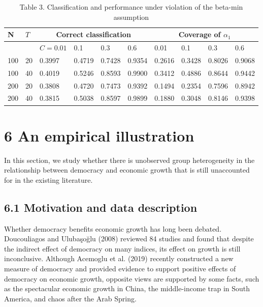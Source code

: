 \documentclass[10pt]{article}
\begin{document}
\begin{table}[h]
\begin{center}
\captionsetup{labelformat=empty}
\caption{Table 3. Classification and performance under violation of the beta-min assumption}
\begin{tabular}{|l|l|l|l|l|l|l|l|l|l|}
\hline
\multirow[b]{2}{*}{N} & \multirow[b]{2}{*}{$T$} & \multicolumn{4}{|c|}{Correct classification} & \multicolumn{4}{|c|}{Coverage of $\alpha_{1}$} \\
\hline
 &  & $C=0.01$ & 0.1 & 0.3 & 0.6 & 0.01 & 0.1 & 0.3 & 0.6 \\
\hline
100 & 20 & 0.3997 & 0.4719 & 0.7428 & 0.9354 & 0.2616 & 0.3428 & 0.8026 & 0.9068 \\
\hline
100 & 40 & 0.4019 & 0.5246 & 0.8593 & 0.9900 & 0.3412 & 0.4886 & 0.8644 & 0.9442 \\
\hline
200 & 20 & 0.3808 & 0.4720 & 0.7473 & 0.9392 & 0.1494 & 0.2354 & 0.7596 & 0.8942 \\
\hline
200 & 40 & 0.3815 & 0.5038 & 0.8597 & 0.9899 & 0.1880 & 0.3048 & 0.8146 & 0.9398 \\
\hline
\end{tabular}
\end{center}
\end{table}

\section*{6 An empirical illustration}
In this section, we study whether there is unobserved group heterogeneity in the relationship between democracy and economic growth that is still unaccounted for in the existing literature.

\subsection*{6.1 Motivation and data description}
Whether democracy benefits economic growth has long been debated. Doucouliagos and Ulubaşoğlu (2008) reviewed 84 studies and found that despite the indirect effect of democracy on many indices, its effect on growth is still inconclusive. Although Acemoglu et al. (2019) recently constructed a new measure of democracy and provided evidence to support positive effects of democracy on economic growth, opposite views are supported by some facts, such as the spectacular economic growth in China, the middle-income trap in South America, and chaos after the Arab Spring.
\end{document}
